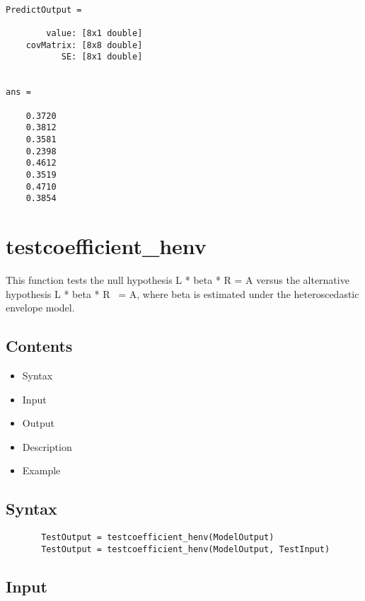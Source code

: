 \documentclass[a4paper,11pt,openany]{memoir}
\begin{document}
        \color{lightgray}\ttfamily \begin{verbatim}

PredictOutput = 

        value: [8x1 double]
    covMatrix: [8x8 double]
           SE: [8x1 double]


ans =

    0.3720
    0.3812
    0.3581
    0.2398
    0.4612
    0.3519
    0.4710
    0.3854

\end{verbatim} \rmfamily
\color{black}
    
\newpage

\rmfamily
\color{black}\section{testcoefficient\_henv}


This function tests the null hypothesis L * beta * R = A versus the
alternative hypothesis L * beta * R ~= A, where beta is estimated under
the heteroscedastic envelope model.
    
\subsection*{Contents}

\begin{itemize}
\setlength{\itemsep}{-1ex}
   \item Syntax
   \item Input
   \item Output
   \item Description
   \item Example
\end{itemize}


\subsection*{Syntax}


\begin{verbatim}       TestOutput = testcoefficient_henv(ModelOutput)
       TestOutput = testcoefficient_henv(ModelOutput, TestInput)\end{verbatim}
    

\subsection*{Input}
\end{document}
